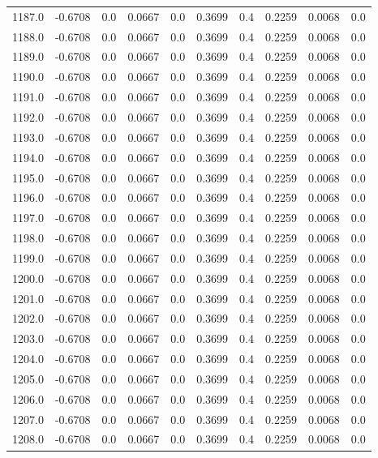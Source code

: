 \begin{longtable}{lrrrrrrrrr}
1187.0 & -0.6708 & 0.0 & 0.0667 & 0.0 & 0.3699 & 0.4 & 0.2259 & 0.0068 & 0.0 \\
1188.0 & -0.6708 & 0.0 & 0.0667 & 0.0 & 0.3699 & 0.4 & 0.2259 & 0.0068 & 0.0 \\
1189.0 & -0.6708 & 0.0 & 0.0667 & 0.0 & 0.3699 & 0.4 & 0.2259 & 0.0068 & 0.0 \\
1190.0 & -0.6708 & 0.0 & 0.0667 & 0.0 & 0.3699 & 0.4 & 0.2259 & 0.0068 & 0.0 \\
1191.0 & -0.6708 & 0.0 & 0.0667 & 0.0 & 0.3699 & 0.4 & 0.2259 & 0.0068 & 0.0 \\
1192.0 & -0.6708 & 0.0 & 0.0667 & 0.0 & 0.3699 & 0.4 & 0.2259 & 0.0068 & 0.0 \\
1193.0 & -0.6708 & 0.0 & 0.0667 & 0.0 & 0.3699 & 0.4 & 0.2259 & 0.0068 & 0.0 \\
1194.0 & -0.6708 & 0.0 & 0.0667 & 0.0 & 0.3699 & 0.4 & 0.2259 & 0.0068 & 0.0 \\
1195.0 & -0.6708 & 0.0 & 0.0667 & 0.0 & 0.3699 & 0.4 & 0.2259 & 0.0068 & 0.0 \\
1196.0 & -0.6708 & 0.0 & 0.0667 & 0.0 & 0.3699 & 0.4 & 0.2259 & 0.0068 & 0.0 \\
1197.0 & -0.6708 & 0.0 & 0.0667 & 0.0 & 0.3699 & 0.4 & 0.2259 & 0.0068 & 0.0 \\
1198.0 & -0.6708 & 0.0 & 0.0667 & 0.0 & 0.3699 & 0.4 & 0.2259 & 0.0068 & 0.0 \\
1199.0 & -0.6708 & 0.0 & 0.0667 & 0.0 & 0.3699 & 0.4 & 0.2259 & 0.0068 & 0.0 \\
1200.0 & -0.6708 & 0.0 & 0.0667 & 0.0 & 0.3699 & 0.4 & 0.2259 & 0.0068 & 0.0 \\
1201.0 & -0.6708 & 0.0 & 0.0667 & 0.0 & 0.3699 & 0.4 & 0.2259 & 0.0068 & 0.0 \\
1202.0 & -0.6708 & 0.0 & 0.0667 & 0.0 & 0.3699 & 0.4 & 0.2259 & 0.0068 & 0.0 \\
1203.0 & -0.6708 & 0.0 & 0.0667 & 0.0 & 0.3699 & 0.4 & 0.2259 & 0.0068 & 0.0 \\
1204.0 & -0.6708 & 0.0 & 0.0667 & 0.0 & 0.3699 & 0.4 & 0.2259 & 0.0068 & 0.0 \\
1205.0 & -0.6708 & 0.0 & 0.0667 & 0.0 & 0.3699 & 0.4 & 0.2259 & 0.0068 & 0.0 \\
1206.0 & -0.6708 & 0.0 & 0.0667 & 0.0 & 0.3699 & 0.4 & 0.2259 & 0.0068 & 0.0 \\
1207.0 & -0.6708 & 0.0 & 0.0667 & 0.0 & 0.3699 & 0.4 & 0.2259 & 0.0068 & 0.0 \\
1208.0 & -0.6708 & 0.0 & 0.0667 & 0.0 & 0.3699 & 0.4 & 0.2259 & 0.0068 & 0.0 \\

\end{longtable}
